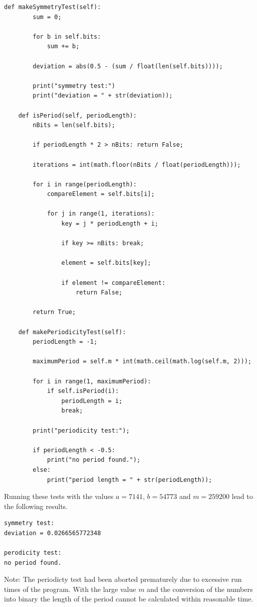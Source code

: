 \begin{lstlisting}[caption=Problem 3.6 b)]
	def makeSymmetryTest(self):
		sum = 0;
		
		for b in self.bits:
			sum += b;
		
		deviation = abs(0.5 - (sum / float(len(self.bits))));
		
		print("symmetry test:")
		print("deviation = " + str(deviation));
	
	def isPeriod(self, periodLength):
		nBits = len(self.bits);
		
		if periodLength * 2 > nBits: return False;
		
		iterations = int(math.floor(nBits / float(periodLength)));
		
		for i in range(periodLength):
			compareElement = self.bits[i];
		
			for j in range(1, iterations):
				key = j * periodLength + i;
				
				if key >= nBits: break;
				
				element = self.bits[key];
				
				if element != compareElement:
					return False;
		
		return True;
	
	def makePeriodicityTest(self):
		periodLength = -1;
		
		maximumPeriod = self.m * int(math.ceil(math.log(self.m, 2)));
		
		for i in range(1, maximumPeriod):
			if self.isPeriod(i):
				periodLength = i;
				break;
		
		print("periodicity test:");
		
		if periodLength < -0.5:
			print("no period found.");
		else:
			print("period length = " + str(periodLength));
\end{lstlisting}

Running these tests with the values $a = 7141$, $b = 54773$ and $m = 259200$ lead to the following results.

\begin{lstlisting}[caption=Result of 3.6 b), keywordstyle=\color{black}]
symmetry test:
deviation = 0.0266565772348

perodicity test:
no period found.
\end{lstlisting}

Note: The periodicty test had been aborted prematurely due to excessive run times of the program. With the large value $m$ and the conversion of the numbers into binary the length of the period cannot be calculated within reasonable time.


